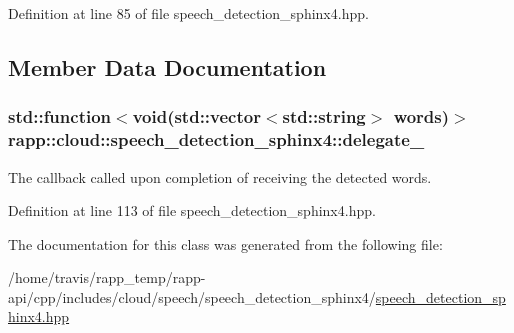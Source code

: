 Definition at line 85 of file speech\-\_\-detection\-\_\-sphinx4.\-hpp.



\subsection{Member Data Documentation}
\hypertarget{classrapp_1_1cloud_1_1speech__detection__sphinx4_a86ab4eead356c5a2f60e3e627f0f75f7}{
\subsubsection[{delegate\-\_\-}]{\setlength{\rightskip}{0pt plus 5cm}std\-::function$<$void(std\-::vector$<$std\-::string$>$ words)$>$ rapp\-::cloud\-::speech\-\_\-detection\-\_\-sphinx4\-::delegate\-\_\-\hspace{0.3cm}{\ttfamily [private]}}}\label{classrapp_1_1cloud_1_1speech__detection__sphinx4_a86ab4eead356c5a2f60e3e627f0f75f7}


The callback called upon completion of receiving the detected words. 



Definition at line 113 of file speech\-\_\-detection\-\_\-sphinx4.\-hpp.



The documentation for this class was generated from the following file\-:\begin{DoxyCompactItemize}
\item 
/home/travis/rapp\-\_\-temp/rapp-\/api/cpp/includes/cloud/speech/speech\-\_\-detection\-\_\-sphinx4/\hyperlink{speech__detection__sphinx4_8hpp}{speech\-\_\-detection\-\_\-sphinx4.\-hpp}\end{DoxyCompactItemize}
